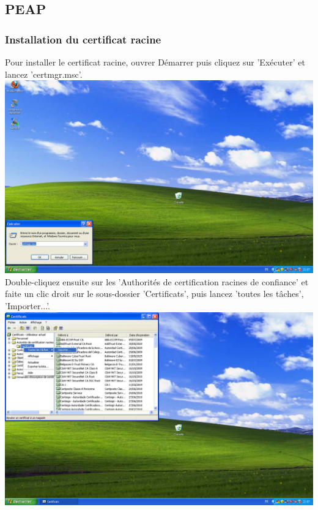 \subsection{PEAP}

\subsubsection{Installation du certificat racine}
Pour installer le certificat racine, ouvrer Démarrer puis cliquez sur 'Exécuter' et lancez 'certmgr.msc'.\\
\includegraphics[width=\screenShotSize{}]{imgUser/certmgr.PNG}\\
Double-cliquez ensuite sur les 'Authorités de certification racines de confiance' et faite un clic droit sur le sous-dossier 'Certificats', puis lancez 'toutes les tâches', 'Importer...'.\\
\includegraphics[width=\screenShotSize{}]{imgUser/importCacert.PNG}\\

